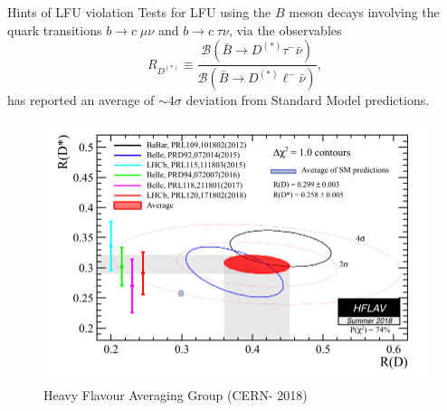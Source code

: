 \documentclass[9pt,usenames,dvipsnames]{beamer}
\begin{document}
\begin{frame}{ Hints of LFU violation}
	Tests for LFU using the $B$ meson decays involving the quark transitions 
	$ b\to c \;\mu \nu$ and $ b\to c \;\tau \nu$, via the observables
	\begin{equation*}
	R_{D^{(*)}} \equiv \frac{\mathcal B (\bar B \to D^{(*)} \tau ^- \bar \nu)}{\mathcal B (\bar B \to D^{(*)} \ell ^- \bar \nu)},
	\end{equation*}
	has reported an average of $\sim 4 \sigma$ deviation from Standard Model predictions.
	\begin{figure}
		\centering
		\includegraphics[width=.65 \textwidth]{./assets/rdrds_summer18} \\
		{\tiny Heavy Flavour Averaging  Group (CERN- 2018)}
	\end{figure}
\end{frame}
\end{document}
